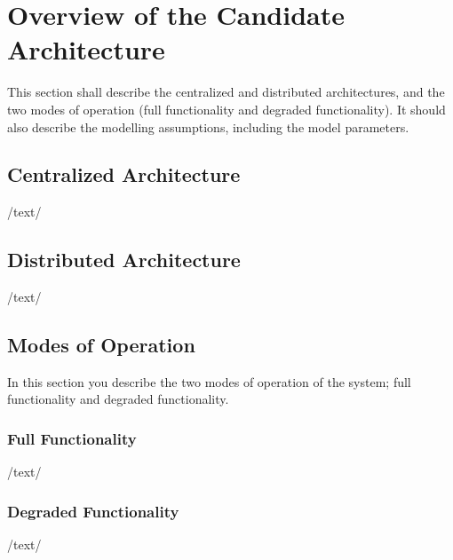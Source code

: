 
\newpage
\section{Overview of the Candidate Architecture}
{This section shall describe the centralized and distributed architectures, and the two modes of operation (full functionality and degraded functionality). It should also describe the modelling assumptions, including the model parameters.} 
\subsection{Centralized Architecture}
/text/
\subsection{Distributed Architecture}
/text/
\subsection{Modes of Operation}
In this section you describe the two modes of operation of the system; full functionality and degraded functionality.
\subsubsection{Full Functionality}
/text/
\subsubsection{Degraded Functionality}
/text/
